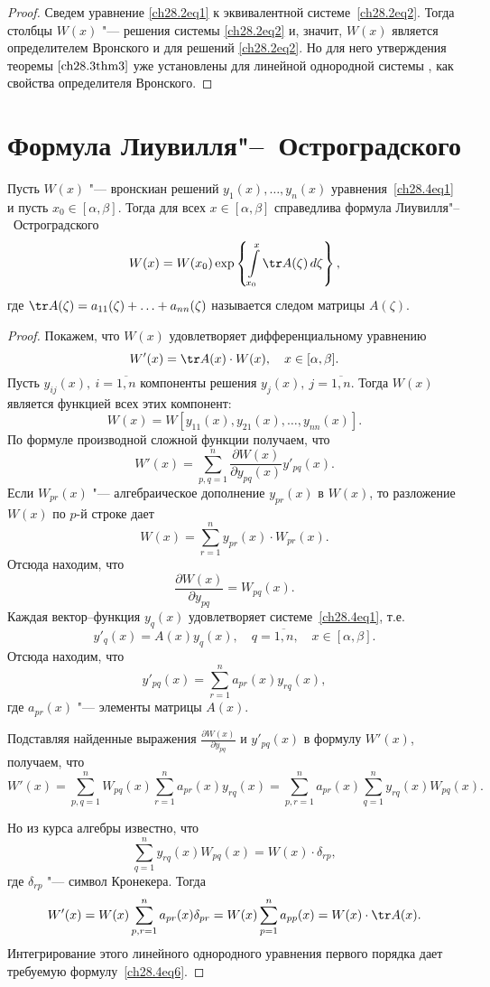 \begin{proof}
Сведем уравнение \eqref{ch28.2eq1} к эквивалентной системе~\eqref{ch28.2eq2}. Тогда столбцы $W(x)$ "--- решения системы \eqref{ch28.2eq2} и, значит, $W(x)$ является определителем Вронского и для решений \eqref{ch28.2eq2}. Но для него утверждения теоремы $\ref{ch28.3thm3}$ уже установлены для линейной однородной системы , как свойства определителя Вронского.
\end{proof}

\section{Формула Лиувилля"--~Остроградского}

\begin{thm}
Пусть $W(x)$ "--- вронскиан решений $y_1(x), \ldots, y_n(x)$ уравнения~\eqref{ch28.4eq1} и пусть $x_0 \in [\alpha, \beta]$. Тогда для всех $x \in [\alpha, \beta]$ справедлива формула Лиувилля"--~Остроградского
\begin{equation} \label{ch28.4eq6}
W(x) = W(x_0) \exp \left\lbrace \int\limits_{x_0}^{x} \tr A(\zeta) \,d\zeta \right\rbrace,
\end{equation}
где $\tr A(\zeta) = a_{11}(\zeta) + \ldots + a_{nn}(\zeta)$ называется следом матрицы $A(\zeta)$.
\end{thm}

\begin{proof}
Покажем, что $W(x)$ удовлетворяет дифференциальному уравнению
$$
W'(x) = \tr A(x) \cdot W(x), \quad x \in [\alpha, \beta].
$$
Пусть $y_{ij}(x),\ i = \overline{1,n}$ компоненты решения $y_j(x),\ j = \overline{1,n}$. Тогда $W(x)$ является функцией всех этих компонент:
$$
W(x) = W[y_{11}(x), y_{21}(x), \ldots, y_{nn}(x)].
$$
По формуле производной сложной функции получаем, что 
$$
W'(x) = \sum\limits_{p,q = 1}^{n} \frac{\partial W(x)}{\partial y_{pq}(x)} y'_{pq}(x).
$$
Если $W_{pr}(x)$ "--- алгебраическое дополнение $y_{pr}(x)$ в $W(x)$, то разложение~$W(x)$ по $p$-й строке дает
$$
W(x) = \sum\limits_{r = 1}^{n} y_{pr}(x) \cdot W_{pr}(x).
$$
Отсюда находим, что 
$$
\frac{\partial W(x)}{\partial y_{pq}} = W_{pq}(x).
$$
Каждая вектор--функция $y_q(x)$ удовлетворяет системе~\eqref{ch28.4eq1}, т.е.
$$
y'_q(x) = A(x)y_q(x), \quad q = \overline{1,n}, \quad x \in [\alpha, \beta].
$$
Отсюда находим, что 
$$
y'_{pq}(x) = \sum\limits_{r = 1}^{n} a_{pr}(x)y_{rq}(x),
$$
где $a_{pr}(x)$ "--- элементы матрицы $A(x)$.

Подставляя найденные выражения $\frac{\partial W(x)}{\partial y_{pq}}$ и $y'_{pq}(x)$ в формулу $W'(x)$, получаем, что
$$
W'(x) = \sum\limits_{p,q = 1}^{n} W_{pq}(x) \sum\limits_{r = 1}^{n} a_{pr}(x)y_{rq}(x) = \sum\limits_{p,r = 1}^{n} a_{pr}(x) \sum\limits_{q = 1}^{n} y_{rq}(x) W_{pq}(x).
$$

Но из курса алгебры известно, что 
$$
\sum\limits_{q = 1}^{n}y_{rq}(x) W_{pq}(x) = W(x) \cdot \delta_{rp},
$$
где $\delta_{rp}$ "--- символ Кронекера. Тогда
$$
W'(x) = W(x) \sum\limits_{p,r = 1}^{n} a_{pr}(x) \delta_{pr} = W(x) \sum\limits_{p = 1}^{n} a_{pp}(x) = W(x) \cdot \tr A(x).
$$
Интегрирование этого линейного однородного уравнения первого порядка дает требуемую формулу~\eqref{ch28.4eq6}.
\end{proof}

